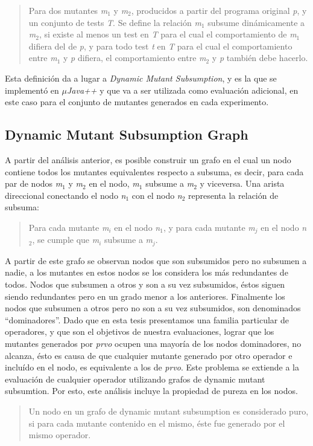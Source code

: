 \begin{quote}
	Para dos mutantes \emph{m$_1$} y \emph{m$_2$}, producidos a partir del programa original \emph{p}, y un conjunto de tests \emph{T}. Se define la relaci\'on \emph{m$_1$} subsume din\'amicamente a \emph{m$_2$}, si existe al menos un test en \emph{T} para el cual el comportamiento de \emph{m$_1$} difiera del de \emph{p}, y para todo test \emph{t} en \emph{T} para el cual el comportamiento entre \emph{m$_1$} y \emph{p} difiera, el comportamiento entre \emph{m$_2$} y \emph{p} tambi\'en debe hacerlo.
\end{quote}
Esta definici\'on da a lugar a \emph{Dynamic Mutant Subsumption}, y es la que se implement\'o en \emph{$\mu$Java++} y que va a ser utilizada como evaluaci\'on adicional, en este caso para el conjunto de mutantes generados en cada experimento.

\subsection{Dynamic Mutant Subsumption Graph}
\label{sec:implementation.dynamicSubsumption.graph}

A partir del an\'alisis anterior, es posible construir un grafo en el cual un nodo contiene todos los mutantes equivalentes respecto a subsuma, es decir, para cada par de nodos \emph{m$_1$} y \emph{m$_2$} en el nodo, \emph{m$_1$} subsume a \emph{m$_2$} y viceversa. Una arista direccional conectando el nodo \emph{n$_1$} con el nodo \emph{n$_2$} representa la relaci\'on de subsuma:
\begin{quote}
	Para cada mutante \emph{m$_i$} en el nodo \emph{n$_1$}, y para cada mutante \emph{m$_j$} en el nodo \emph{n$_2$}, se cumple que \emph{m$_i$} subsume a \emph{m$_j$}.
\end{quote}
A partir de este grafo se observan nodos que son subsumidos pero no subsumen a nadie, a los mutantes en estos nodos se los considera los m\'as redundantes de todos. Nodos que subsumen a otros y son a su vez subsumidos, \'estos siguen siendo redundantes pero en un grado menor a los anteriores. Finalmente los nodos que subsumen a otros pero no son a su vez subsumidos, son denominados ``dominadores''. Dado que en esta tesis presentamos una familia particular de operadores, y que son el objetivos de nuestra evaluaciones, lograr que los mutantes generados por \emph{prvo} ocupen una mayor\'ia de los nodos dominadores, no alcanza, \'esto es causa de que cualquier mutante generado por otro operador e inclu\'ido en el nodo, es equivalente a los de \emph{prvo}. Este problema se extiende a la evaluaci\'on de cualquier operador utilizando grafos de dynamic mutant subsumtion. Por esto, este an\'alisis incluye la propiedad de pureza en los nodos.
\begin{quote}
	Un nodo en un grafo de dynamic mutant subsumption es considerado puro, si para cada mutante contenido en el mismo, \'este fue generado por el mismo operador.
\end{quote}